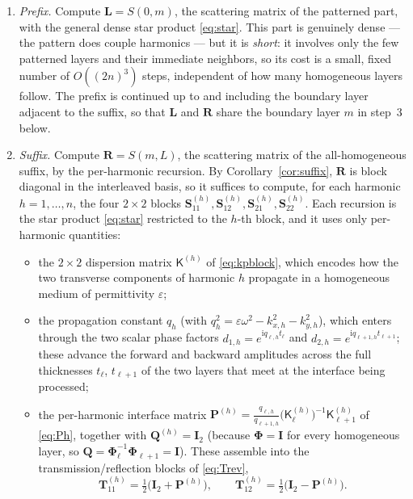 \documentclass[11pt]{article}
\theoremstyle{remark}
\newcommand{\eps}{\varepsilon}
\newcommand{\kp}{\mathsf{K}}
\newcommand{\Ph}{\mathbf{\Phi}}
\newcommand{\Id}{\mathbf{I}}
\newcommand{\ii}{\mathrm{i}}
\begin{document}
\begin{enumerate}
\item \emph{Prefix.} Compute $\mathbf{L}=S(0,m)$, the scattering matrix of the
  patterned part, with the general dense star product \eqref{eq:star}.  This
  part is genuinely dense --- the pattern does couple harmonics --- but it is
  \emph{short}: it involves only the few patterned layers and their immediate
  neighbors, so its cost is a small, fixed number of $O((2n)^3)$ steps,
  independent of how many homogeneous layers follow.  The prefix is continued
  up to and including the boundary layer adjacent to the suffix, so that
  $\mathbf{L}$ and $\mathbf{R}$ share the boundary layer $m$ in
  step~3 below.

\item \emph{Suffix.} Compute $\mathbf{R}=S(m,L)$, the scattering matrix of the
  all-homogeneous suffix, by the per-harmonic recursion.  By
  Corollary~\ref{cor:suffix}, $\mathbf{R}$ is block diagonal in the interleaved
  basis, so it suffices to compute, for each harmonic $h=1,\dots,n$, the four
  $2\times2$ blocks $\mathbf{S}^{(h)}_{11},\mathbf{S}^{(h)}_{12},
  \mathbf{S}^{(h)}_{21},\mathbf{S}^{(h)}_{22}$.  Each recursion is the star
  product \eqref{eq:star} restricted to the $h$-th block, and it uses only
  per-harmonic quantities:

  \begin{itemize}
  \item the $2\times2$ dispersion matrix $\kp^{(h)}$ of \eqref{eq:kpblock},
    which encodes how the two transverse components of harmonic $h$ propagate
    in a homogeneous medium of permittivity $\eps$;
  \item the propagation constant $q_h$ (with $q_h^2=\eps\omega^2-k_{x,h}^2-
    k_{y,h}^2$), which enters through the two scalar phase factors
    $d_{1,h}=e^{\ii q_{\ell,h}t_\ell}$ and $d_{2,h}=e^{\ii q_{\ell+1,h}
    t_{\ell+1}}$; these advance the forward and backward amplitudes across the
    full thicknesses $t_\ell$, $t_{\ell+1}$ of the two layers that meet at the
    interface being processed;
  \item the per-harmonic interface matrix
    $\mathbf{P}^{(h)}=\tfrac{q_{\ell,h}}{q_{\ell+1,h}}
    \bigl(\kp^{(h)}_\ell\bigr)^{-1}\kp^{(h)}_{\ell+1}$
    of \eqref{eq:Ph}, together with $\mathbf{Q}^{(h)}=\Id_2$ (because
    $\Ph=\Id$ for every homogeneous layer, so $\mathbf{Q}=\Ph_\ell^{-1}
    \Ph_{\ell+1}=\Id$).  These assemble into the transmission/reflection
    blocks of \eqref{eq:Trev},
    \begin{equation*}
    \mathbf{T}^{(h)}_{11}=\tfrac12\bigl(\Id_2+\mathbf{P}^{(h)}\bigr),\qquad
    \mathbf{T}^{(h)}_{12}=\tfrac12\bigl(\Id_2-\mathbf{P}^{(h)}\bigr).
    \end{equation*}
  \end{itemize}


\end{enumerate}
\end{document}
